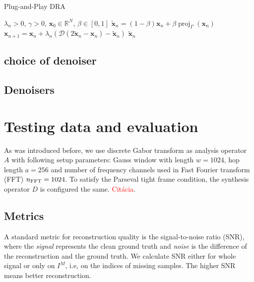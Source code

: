 \documentclass[conference]{IEEEtran}
\newcommand{\todo}[1]{\textcolor{red}{#1}}
\begin{document}
\begin{algorithm}
	\caption{Plug-and-Play DRA}
	\begin{algorithmic}[1]\label{alg:pnp}
		\renewcommand{\algorithmicrequire}{\textbf{Input:}}
		\renewcommand{\algorithmicensure}{\textbf{Output:}}
		\REQUIRE $ \lambda_n > 0 $, $ \gamma>0 $, $ \mathbf{x}_0 \in \mathbb{R}^{N} $, $\beta \in [0, 1]$
		\STATE %
		$\mathbf{\widetilde{x}}_n= (1-\beta)\mathbf{x}_n + \beta \operatorname{proj}_{\Gamma}(\mathbf{x}_n) $ 
		\STATE $ \mathbf{x}_{n+1} = \mathbf{x}_n + \lambda_n \left( \mathcal{D} \left(2\mathbf{\widetilde{x}}_n-\mathbf{x}_n \right)-\mathbf{\widetilde{x}}_n\right)$
		\ENDFOR
		\RETURN $\mathbf{\widetilde{x}}_n$ 
	\end{algorithmic} 
\end{algorithm}
\subsection{choice of denoiser}

\subsection{Denoisers}

\section{Testing data and evaluation}\label{sec:eval}

As was introduced before, we use discrete Gabor transform as analysis operator $A$ with following setup parameters: Gauss  window with length $w =1024 $, hop length $a = 256$ and number of frequency channels used in Fast Fourier transform (FFT) $n_{\textup{FFT}} = 1024$.
To satisfy the Parseval tight frame condition, the synthesis operator $D$ is configured the same. \todo{Citácia}.

\subsection{Metrics}


A standard metric for reconstruction quality is the signal-to-noise ratio (SNR), where the \textit{signal} represents the clean ground truth and \textit{noise} is the difference of the reconstruction and the ground truth.
We calculate SNR either for whole signal or only on $I^M$, i.e, on the indices of missing samples.
The higher SNR means better reconstruction.
\end{document}
